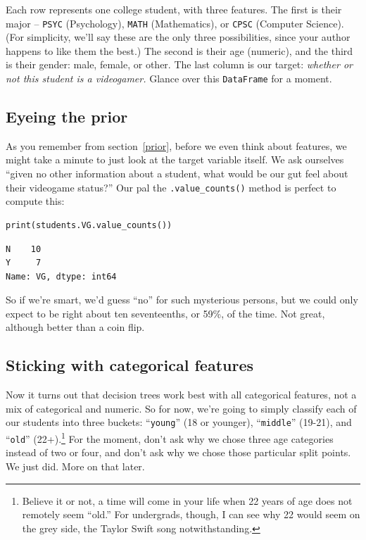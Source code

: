 
Each row represents one college student, with three features. The first is
their major -- \texttt{PSYC} (Psychology), \texttt{MATH} (Mathematics), or
\texttt{CPSC} (Computer Science). (For simplicity, we'll say these are the only
three possibilities, since your author happens to like them the best.) The
second is their age (numeric), and the third is their gender: male, female, or
other. The last column is our target: \textit{whether or not this student is a
videogamer.} Glance over this \texttt{DataFrame} for a moment.

\subsection{Eyeing the prior}


As you remember from section~\ref{prior}, before we even think about features,
we might take a minute to just look at the target variable itself. We ask
ourselves ``given no other information about a student, what would be our gut
feel about their videogame status?'' Our pal the \texttt{.value\_counts()}
method is perfect to compute this:

\begin{Verbatim}[fontsize=\small,samepage=true,frame=single,framesep=3mm]
print(students.VG.value_counts())
\end{Verbatim}
\vspace{-.4in}

\begin{Verbatim}[fontsize=\small,samepage=true,frame=leftline,framesep=5mm,framerule=1mm]
N    10
Y     7
Name: VG, dtype: int64
\end{Verbatim}

So if we're smart, we'd guess ``no'' for such mysterious persons, but we could
only expect to be right about ten seventeenths, or 59\%, of the
time. Not great, although better than a coin flip.

\smallskip
\subsection{Sticking with categorical features}


Now it turns out that decision trees work best with all categorical features,
not a mix of categorical and numeric. So for now, we're going to simply
classify each of our students into three buckets: ``\texttt{young}'' (18 or
younger), ``\texttt{middle}'' (19-21), and ``\texttt{old}''
(22+).\footnote{ Believe it or not, a time will come in
your life when 22 years of age does not remotely seem ``old.'' For undergrads,
though, I can see why 22 would seem on the grey side, the Taylor Swift song
notwithstanding.} For the moment, don't ask why we chose three age categories
instead of two or four, and don't ask why we chose those particular split
points. We just did. More on that later.

